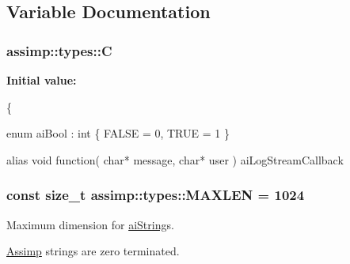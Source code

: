 \subsection{Variable Documentation}
\hypertarget{namespaceassimp_1_1types_a341b9b1988881d7d7f7c86e12a67aa3d}{
\subsubsection[{C}]{\setlength{\rightskip}{0pt plus 5cm}assimp\+::types\+::\+C}}\label{namespaceassimp_1_1types_a341b9b1988881d7d7f7c86e12a67aa3d}
{\bfseries Initial value\+:}
\begin{DoxyCode}
\{
   
   \textcolor{keyword}{enum} aiBool : \textcolor{keywordtype}{int} \{
      FALSE = 0,
      TRUE = 1
   \}

   
   alias \textcolor{keywordtype}{void} \textcolor{keyword}{function}( \textcolor{keywordtype}{char}* message, \textcolor{keywordtype}{char}* user ) aiLogStreamCallback
\end{DoxyCode}
\hypertarget{namespaceassimp_1_1types_a43a64bf6b45fdc2376b2d8baa2b275f4}{
\subsubsection[{M\+A\+X\+L\+E\+N}]{\setlength{\rightskip}{0pt plus 5cm}const size\+\_\+t assimp\+::types\+::\+M\+A\+X\+L\+E\+N = 1024}}\label{namespaceassimp_1_1types_a43a64bf6b45fdc2376b2d8baa2b275f4}
Maximum dimension for {\ttfamily \hyperlink{structassimp_1_1types_1_1ai_string}{ai\+String}}s.

\hyperlink{class_assimp}{Assimp} strings are zero terminated. 